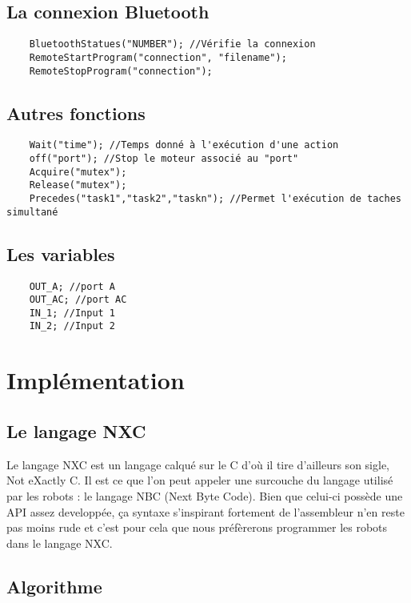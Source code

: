 \subsection{La connexion Bluetooth }
\begin{verbatim}
	BluetoothStatues("NUMBER"); //Vérifie la connexion
	RemoteStartProgram("connection", "filename");
	RemoteStopProgram("connection");

\end{verbatim}

\subsection{Autres fonctions }
\begin{verbatim}
	Wait("time"); //Temps donné à l'exécution d'une action
	off("port"); //Stop le moteur associé au "port"
	Acquire("mutex"); 
	Release("mutex"); 
	Precedes("task1","task2","taskn"); //Permet l'exécution de taches simultané

\end{verbatim}

\subsection{Les variables }
\begin{verbatim}
	OUT_A; //port A
	OUT_AC; //port AC
	IN_1; //Input 1
	IN_2; //Input 2

\end{verbatim}

\section{Implémentation}

\subsection{Le langage NXC}

Le langage NXC est un langage calqué sur le C d'où il tire d'ailleurs son
sigle, Not eXactly C. Il est ce que l'on peut appeler une surcouche du
langage utilisé par les robots  : le langage NBC (Next Byte Code). Bien
que celui-ci possède une API assez developpée, ça syntaxe s'inspirant
fortement de l'assembleur n'en reste pas moins rude et c'est pour cela
que nous préfèrerons programmer les robots  dans le langage NXC.


\subsection{Algorithme}


